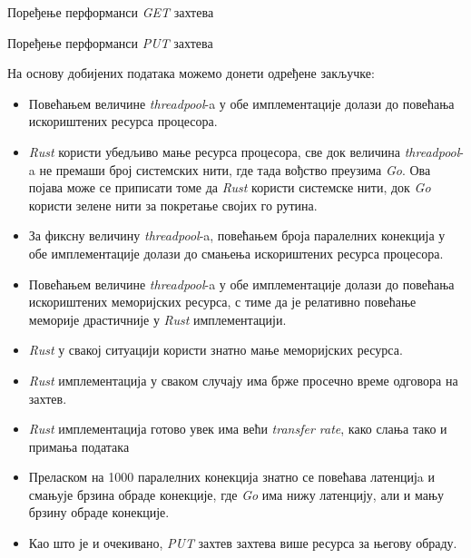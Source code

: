 \begin{sidewaystable}
  \centering
  \caption{Поређење перформанси \textit{GET} захтева}
  \label{tab:get_perf_comp}
\end{sidewaystable}

\begin{sidewaystable}
  \centering
  \caption{Поређење перформанси \textit{PUT} захтева}
  \label{tab:put_perf_comp}
\end{sidewaystable}

\pagebreak
На основу добијених података можемо донети одређене закључке:
\begin{itemize}
    \item Повећањем величине \textit{threadpool}-a у обе имплементације долази до повећања искориштених ресурса процесора.
    
    \item \textit{Rust} користи убедљиво мање ресурса процесора, све док величина \textit{threadpool}-a не премаши број системских нити, где тада вођство преузима \textit{Go}. Ова појава може се приписати томе да \textit{Rust} користи системске нити, док \textit{Go} користи зелене нити за покретање својих го рутина. 

    \item За фиксну величину \textit{threadpool}-a, повећањем броја паралелних конекција у обе имплементације долази до смањења искориштених ресурса процесора.

    \item Повећањем величине \textit{threadpool}-a у обе имплементације долази до повећања искориштених  меморијских ресурса, с тиме да је релативно повећање меморије драстичније у \textit{Rust} имплементацији.

    \item \textit{Rust} у свакој ситуацији користи знатно мање меморијских ресурса.

    \item \textit{Rust} имплементација у сваком случају има брже просечно време одговора на захтев.
    
    \item \textit{Rust} имплементација готово увек има већи \textit{transfer rate}, како слања тако и примања података

    \item Преласком на 1000 паралелних конекција знатно се повећава латенцијa и смањује брзина обраде конекције, где \textit{Go} има нижу латенцију, али и мању брзину обраде конекције.

    \item Као што је и очекивано, \textit{PUT} захтев захтева више ресурса за његову обраду.
    
    
\end{itemize}
